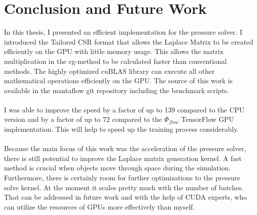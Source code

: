 \chapter{Conclusion and Future Work}\label{chapter:conclusion}

In this thesis, I presented an efficient implementation for the pressure solver. I introduced the Tailored CSR format that allows the Laplace Matrix to be created efficiently on the GPU with little memory usage. This allows the matrix multiplication in the cg-method to be calculated faster than conventional methods. The highly optimized cuBLAS library can execute all other mathematical operations efficiently on the GPU. The source of this work is available in the mantaflow git repository including the benchmark scripts.\\\\
I was able to improve the speed by a factor of up to 139 compared to the CPU version and by a factor of up to 72 compared to the $\Phi_{flow}$ TensorFlow GPU implementation. This will help to speed up the training process considerably.  \\\\
Because the main focus of this work was the acceleration of the pressure solver, there is still potential to improve the Laplace matrix generation kernel. A fast method is crucial when objects move through space during the simulation. Furthermore, there is certainly room for further optimizations to the pressure solve kernel. At the moment it scales pretty much with the number of batches. That can be addressed in future work and with the help of CUDA experts, who can utilize the resources of GPUs more effectively than myself. 